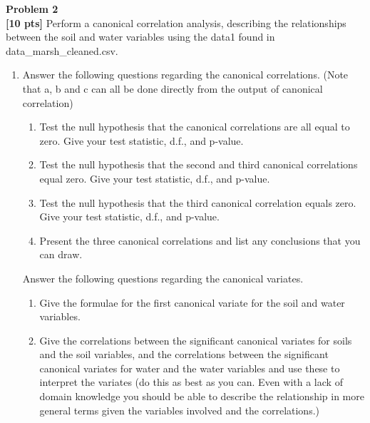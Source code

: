 \documentclass{article}
\newenvironment{problem}[2][Problem]
    { \begin{mdframed}[backgroundcolor=gray!20] \textbf{#1 #2} \\}
    {  \end{mdframed}}
\begin{document}
\newpage
\begin{problem}{2}
\textbf{[10 pts]}
Perform a canonical correlation analysis, describing the relationships between the soil and water variables using the data1 found in data\_marsh\_cleaned.csv.
\begin{enumerate}
	\item Answer the following questions regarding the canonical correlations. (Note that a, b and c can all be done directly from the output of canonical correlation)
	\begin{enumerate}
		\item Test the null hypothesis that the canonical correlations are all equal to zero. Give your test statistic, d.f., and p-value.
		\item Test the null hypothesis that the second and third canonical correlations equal zero. Give your test statistic, d.f., and p-value.
		\item Test the null hypothesis that the third canonical correlation equals zero. Give your test statistic, d.f., and p-value.
		\item Present the three canonical correlations and list any conclusions that you can draw.
	\end{enumerate}
	Answer the following questions regarding the canonical variates.
	\begin{enumerate}
		\item Give the formulae for the first canonical variate for the soil and water variables.
		\item Give the correlations between the significant canonical variates for soils and the soil variables, and the correlations between the significant canonical variates for water and the water variables and use these to interpret the variates (do this as best as you can. Even with a lack of domain knowledge you should be able to describe the relationship in more general terms given the variables involved and the correlations.)
	\end{enumerate}
\end{enumerate}
\end{problem}
\end{document}
